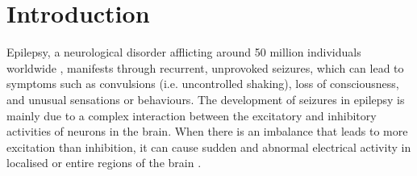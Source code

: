 \documentclass[10pt]{article}
\begin{document}
\begin{sloppypar}
  \begin{abstract}
  \end{abstract}

  \pagebreak
  \tableofcontents
  \pagebreak
  \listoffigures
  \pagebreak


  \section{Introduction}
  \label{sec:introduction}

  Epilepsy, a neurological disorder afflicting around 50 million individuals worldwide \citep{world2019epilepsy}, manifests through recurrent, unprovoked seizures, which can lead to symptoms such as convulsions (i.e. uncontrolled shaking), loss of consciousness, and unusual sensations or behaviours. The development of seizures in epilepsy is mainly due to a complex interaction between the excitatory and inhibitory activities of neurons in the brain. When there is an imbalance that leads to more excitation than inhibition, it can cause sudden and abnormal electrical activity in localised or entire regions of the brain \citep{robinson_propagation_1997}.


\end{sloppypar}
\end{document}
